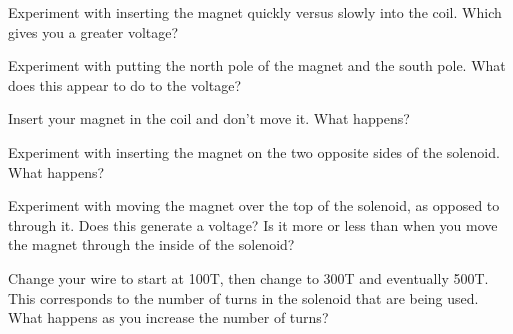 \documentclass[10pt]{exam}
\begin{document}
\begin{questions}

  \question Experiment with inserting the magnet quickly versus slowly into the coil.  Which gives you a greater voltage? \vs 

  \question Experiment with putting the north pole of the magnet and the south pole.  What does this appear to do to the voltage? \vs

  \question Insert your magnet in the coil and don't move it.  What happens? \vs 

  \question Experiment with inserting the magnet on the two opposite sides of the solenoid.  What happens? \vs 

  \question Experiment with moving the magnet over the top of the solenoid, as opposed to through it.  Does this generate a voltage?  Is it more or less than when you move the magnet through the inside of the solenoid?  \vs 

  \question Change your wire to start at 100T, then change to 300T and eventually 500T.  This corresponds to the number of turns in the solenoid that are being used.  What happens as you increase the number of turns? \vs

\end{questions} 
\end{document}
